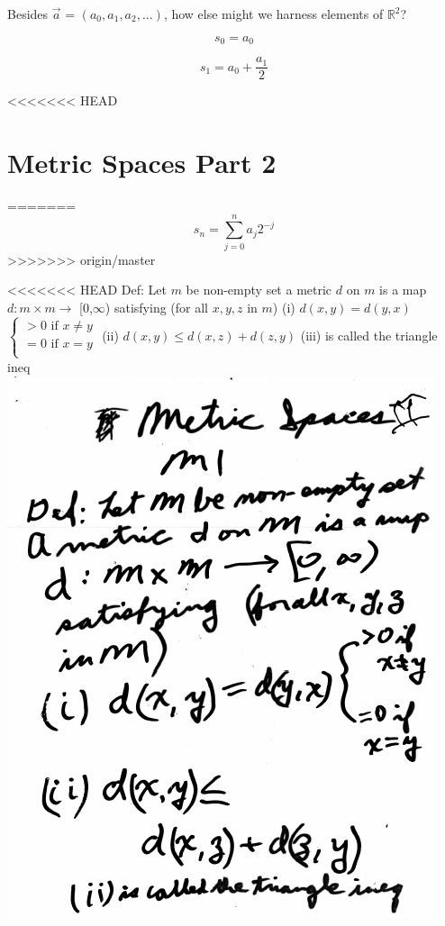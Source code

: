 \documentclass[10pt,a4paper]{article}
\begin{document}
{{\newpage


Besides $\vec{a}$ = $(a{_0}, a_{1}, a_{2}, ...)$, how else might we harness elements of $\mathbb {R}^{2}$?

$$s_0 = a_{0}$$

$$s_1 = a_{0} + \frac{a_{1}}{2}$$



<<<<<<< HEAD
\section{Metric Spaces Part 2} 
=======
$$s_{n} = \sum_{j=0}^{n} a_{j} 2^{-j}$$
>>>>>>> origin/master



<<<<<<< HEAD
Def: Let $m$ be non-empty set a metric $d$ on $m$ is a map
\newline
$d: m \times m \rightarrow$ [0,$\infty$)
\newline
satisfying (for all $x,y,z$ in $m$)
\newline
(i) $d(x,y)=d(y,x)$
$\begin{cases}
>0 \mbox{ if } x \neq y \\
=0 \mbox { if } x=y \\
\end{cases}$
\newline
(ii) $d(x,y)\leq d(x,z)+d(z,y)$
\newline
(iii) is called the triangle ineq
\newline
\includegraphics[scale=.5]{Pages/MS_2_im1}
}}
\end{document}
